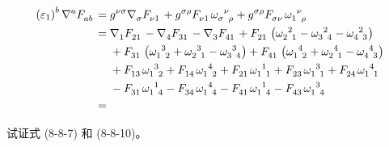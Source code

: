 \begin{xiti}
\begin{jie}
		\begin{align*}
			\tensor{\left( \varepsilon_1 \right)}{^b} \tensor{\nabla}{^a} \tensor{F}{_a_b} ={} & \tensor{g}{^\nu^\sigma} \tensor{\nabla}{_\sigma} \tensor{F}{_\nu_1} + \tensor{g}{^\sigma^\rho} \tensor{F}{_\nu_1} \tensor{\omega}{_\sigma^\nu_\rho} + \tensor{g}{^\sigma^\rho} \tensor{F}{_\sigma_\nu} \tensor{\omega}{_1^\nu_\rho}\\
			={} & \tensor{\nabla}{_1} \tensor{F}{_2_1} - \Nabla{4} \tensor{F}{_3_1} - \Nabla{3} \tensor{F}{_4_1} + \tensor{F}{_2_1} \left( \tensor{\omega}{_2^2_1} - \tensor{\omega}{_3^2_4} - \tensor{\omega}{_4^2_3} \right)\\
			&{} + \tensor{F}{_3_1} \left( \tensor{\omega}{_1^3_2} + \tensor{\omega}{_2^3_1} - \tensor{\omega}{_3^3_4} \right) + \tensor{F}{_4_1} \left( \tensor{\omega}{_1^4_2} + \tensor{\omega}{_2^4_1} - \tensor{\omega}{_4^4_3} \right)\\
			&{} + \tensor{F}{_1_3} \tensor{\omega}{_1^3_2} + \tensor{F}{_1_4} \tensor{\omega}{_1^4_2} + \tensor{F}{_2_1} \tensor{\omega}{_1^1_1} + \tensor{F}{_2_3} \tensor{\omega}{_1^3_1} + \tensor{F}{_2_4} \tensor{\omega}{_1^4_1}\\
			&{} - \tensor{F}{_3_1} \tensor{\omega}{_1^1_4} - \tensor{F}{_3_4} \tensor{\omega}{_1^4_4} - \tensor{F}{_4_1} \tensor{\omega}{_1^1_4} - \tensor{F}{_4_3} \tensor{\omega}{_1^3_4}\\
			={}&
		\end{align*}
	\end{jie}

	\item 试证式 (8-8-7) 和 (8-8-10)。
\end{xiti}
